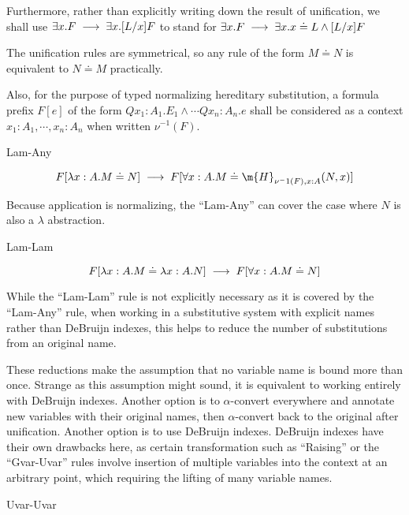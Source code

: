 Furthermore, rather than explicitly writing down the result of unification, 
we shall use $\exists x. F \;\longrightarrow\; \exists x . [ L / x] F$ 
to stand for $\exists x. F \;\longrightarrow\; \exists x . x \doteq L \wedge [ L / x] F$

The unification rules are symmetrical, so any rule of the form 
$M \doteq N$ is equivalent to $N \doteq M$ practically.

Also, for the purpose of typed normalizing hereditary substitution, 
a formula prefix $F[e]$ of the form 
$Qx_1:A_1 . E_1\wedge \cdots Qx_n : A_n . e$ shall be considered as a context
$x_1 : A_1 ,\cdots ,x_n : A_n$ when written $\nu^{-1}(F)$.

\setcounter{tcase}{0}

\begin{tcase}
Lam-Any
\end{tcase}

\[
F[\lambda x : A . M \doteq N]
\UnifiesTo
F[\forall x : A . M \doteq \m{H}_{\nu^-1(F),x:A}(N , x)]
\]

Because application is normalizing, the ``Lam-Any'' can cover the case where $N$ is also a $\lambda$ 
abstraction.

\begin{tcase}
Lam-Lam
\end{tcase}

\[
F[\lambda x : A . M \doteq \lambda x : A . N ]
\;\longrightarrow\;
F[ \forall x : A . M \doteq N ]
\]

While the ``Lam-Lam'' rule is not explicitly necessary as it is covered by the ``Lam-Any'' rule, 
when working
in a substitutive system with explicit names rather than DeBruijn indexes, 
this helps to reduce the number of substitutions from an original name. 

These reductions make the 
assumption that no variable name is bound more than once. 
Strange as this assumption might sound, it is equivalent to working entirely with DeBruijn indexes.
Another option is to $\alpha$-convert everywhere and annotate
new variables with their original names, then $\alpha$-convert
back to the original after unification. Another option is
to use DeBruijn indexes.  DeBruijn indexes have their own drawbacks
here, as certain transformation such as ``Raising''
or the ``Gvar-Uvar'' rules involve insertion of multiple
variables into the context at an arbitrary point, 
which requiring the lifting of many variable names.  

\begin{tcase}
Uvar-Uvar
\end{tcase}

